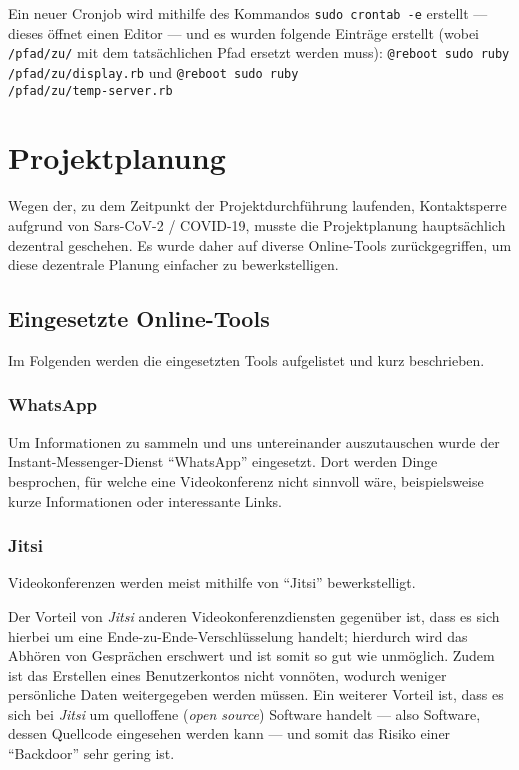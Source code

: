 \documentclass[a4paper,12pt]{article}
\begin{document}
Ein neuer Cronjob wird mithilfe des Kommandos \texttt{sudo crontab -e} erstellt — dieses öffnet einen Editor — und es wurden folgende Einträge erstellt (wobei \texttt{/pfad/zu/} mit dem tatsächlichen Pfad ersetzt werden muss): \texttt{@reboot sudo ruby /pfad/zu/display.rb} und \texttt{@reboot sudo ruby \\/pfad/zu/temp-server.rb}

\pagebreak
\section{Projektplanung}
Wegen der, zu dem Zeitpunkt der Projektdurchführung laufenden, Kontaktsperre aufgrund von Sars-CoV-2 / COVID-19, musste die Projektplanung hauptsächlich dezentral geschehen.
Es wurde daher auf diverse Online-Tools zurückgegriffen, um diese dezentrale Planung einfacher zu bewerkstelligen.

\subsection{Eingesetzte Online-Tools}
Im Folgenden werden die eingesetzten Tools aufgelistet und kurz beschrieben.

\subsubsection{WhatsApp}
Um Informationen zu sammeln und uns untereinander auszutauschen wurde der Instant-Messenger-Dienst "`WhatsApp"' eingesetzt. Dort werden Dinge besprochen, für welche eine Videokonferenz nicht sinnvoll wäre, beispielsweise kurze Informationen oder interessante Links.

\subsubsection{Jitsi}
Videokonferenzen werden meist mithilfe von "`Jitsi"' bewerkstelligt.

Der Vorteil von \textit{Jitsi} anderen Videokonferenzdiensten gegenüber ist, dass es sich hierbei um eine Ende-zu-Ende-Verschlüsselung handelt; hierdurch wird das Abhören von Gesprächen erschwert und ist somit so gut wie unmöglich. Zudem ist das Erstellen eines Benutzerkontos nicht vonnöten, wodurch weniger persönliche Daten weitergegeben werden müssen. Ein weiterer Vorteil ist, dass es sich bei \textit{Jitsi} um quelloffene (\textit{open source}) Software handelt — also Software, dessen Quellcode eingesehen werden kann — und somit das Risiko einer "`Backdoor"' sehr gering ist.
\end{document}
